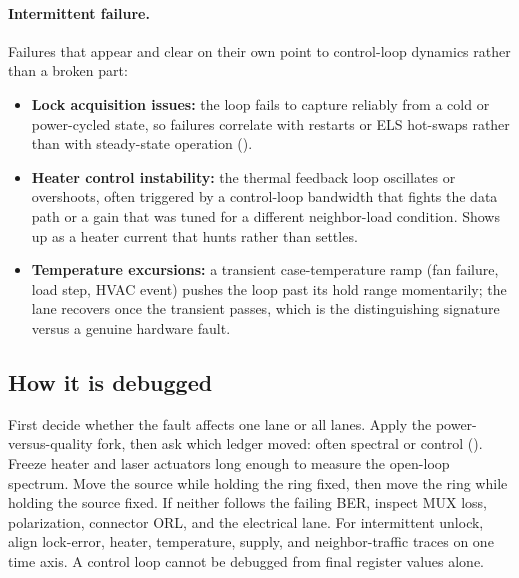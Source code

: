 \paragraph{Intermittent failure.}
Failures that appear and clear on their own point to control-loop dynamics rather
than a broken part:

\begin{itemize}
\item \textbf{Lock acquisition issues:} the loop fails to capture reliably from a
      cold or power-cycled state, so failures correlate with restarts or ELS
      hot-swaps rather than with steady-state operation ().
\item \textbf{Heater control instability:} the thermal feedback loop oscillates or
      overshoots, often triggered by a control-loop bandwidth that fights the data
      path or a gain that was tuned for a different neighbor-load condition. Shows
      up as a heater current that hunts rather than settles.
\item \textbf{Temperature excursions:} a transient case-temperature ramp (fan
      failure, load step, HVAC event) pushes the loop past its hold range
      momentarily; the lane recovers once the transient passes, which is the
      distinguishing signature versus a genuine hardware fault.
\end{itemize}


\subsection{How it is debugged}
\label{sec:wdm-how-debugged}

First decide whether the fault affects one lane or all lanes. Apply the
power-versus-quality fork, then ask which ledger moved: often spectral or
control (). Freeze heater and
laser actuators long enough to measure the open-loop spectrum. Move the source
while holding the ring fixed, then move the ring while holding the source fixed.
If neither follows the failing BER, inspect MUX loss, polarization, connector ORL,
and the electrical lane. For intermittent unlock, align lock-error, heater,
temperature, supply, and neighbor-traffic traces on one time axis. A control loop
cannot be debugged from final register values alone.

